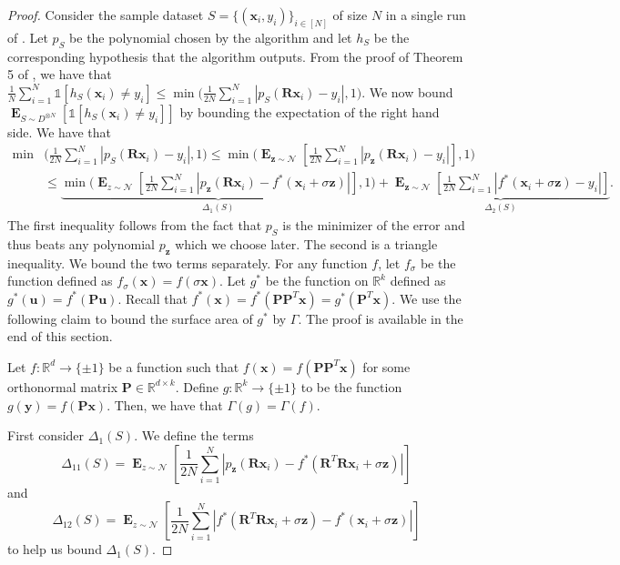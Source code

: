 \documentclass{theoretics}
\renewcommand\vec[1]{\mathbf{#1}}
\DeclareMathOperator*{\E}{\mathbf{E}}
\newcommand{\R}{\mathbb{R}}
\newcommand{\1}{\Ind}
\newcommand{\x}{\vec x}
\newcommand{\z}{\vec z}
\newcommand{\Gauss}{\mathcal{N}}
\newcommand{\ind}{\mathds{1}}
\begin{document}
\begin{proof}
Consider the sample dataset $S=\{(\x_i,y_i)\}_{i\in [N]}$ of size $N$ in a single run of . Let $p_S$ be the polynomial chosen by the algorithm and let $h_S$ be the corresponding hypothesis that the algorithm outputs. From the proof of Theorem 5 of \cite{KKMS:05}, we have that 
$\frac{1}{N}\sum_{i=1}^{N}\ind[h_S(\x_i)\neq y_i]\leq \min\bigl(\frac{1}{2N}\sum_{i=1}^{N}|p_S(\vec R\x_i)-y_i|,1\bigr)$. We now bound $\E_{S\sim D^{\otimes N}}\left[\ind[h_S(\x_i)\neq y_i]\right]$ by bounding the expectation of the right hand side. We have that  
\begin{align*}
\min&\biggl(\frac{1}{2N}\sum_{i=1}^{N}|p_S(\vec R\x_i)-y_i|,1\biggr)
\leq \min\biggl(\E_{\z\sim \Gauss}\left[\frac{1}{2N}\sum_{i=1}^{N}|p_{\z}(\vec R\x_i)-y_i|\right],1\biggr)
\\
&\leq \underbrace{\min\biggl(\E_{z\sim \Gauss}\left[\frac{1}{2N}\sum_{i=1}^{N}|p_{\z}(\vec R\x_i)-f^*(\x_i+\sigma \z)|\right],1\biggr)}_{\Delta_1(S)}+\underbrace{\E_{\z\sim \Gauss}\left[\frac{1}{2N}\sum_{i=1}^{N}|f^*(\x_i+\sigma \z)-y_i|\right]}_{\Delta_2(S)}.
\end{align*}
The first inequality follows from the fact that $p_S$ is the minimizer of the error and thus beats any polynomial $p_{\z}$ which we choose later. The second is a triangle inequality.
We bound the two terms separately.  For any function $f$, let $f_{\sigma}$ be the function defined as $f_{\sigma}(\x)=f(\sigma\x)$. Let $g^*$ be the function on $\R^{k}$ defined as $g^*(\vec u)=f^*(\vec P \vec u)$. Recall that $f^*(\x)=f^*(\vec P\vec P^T\x)=g^*(\vec P^T\x)$. We use the following claim to bound the surface area of $g^*$ by $\Gamma$. The proof is available in the end of this section. 
\begin{lemma}
    \label{lem:sa_low_dimension}
    Let $f:\R^{d}\to\{\pm 1\}$ be a function such that $f(\x)=f(\vec P\vec P^T \x)$ for some orthonormal matrix $\vec P\in \R^{d\times k}$. Define $g:\R^k\to \{\pm 1\}$ to be the function $g(\vec y)=f(\vec P\x)$. Then, we have that $\Gamma(g)=\Gamma(f)$.
\end{lemma}
First consider $\Delta_1(S)$. We define the terms \[\Delta_{11}(S)=\E_{z\sim \Gauss}\left[\frac{1}{2N}\sum_{i=1}^{N}|p_{\z}(\vec R\x_i)-f^*(\vec R^T \vec R\x_i+\sigma\z)|\right]\] and \[\Delta_{12}(S)=\E_{z\sim \Gauss}\left[\frac{1}{2N}\sum_{i=1}^{N}|f^*( \vec R^T \vec R\x_i+\sigma\z)-f^*(\x_i+\sigma \z)|\right]\] to help us bound $\Delta_1(S)$.


\end{proof}
\end{document}
